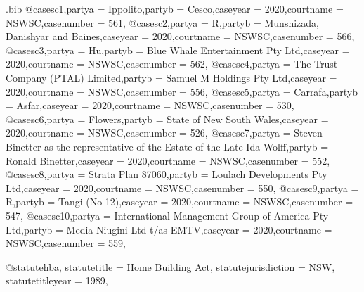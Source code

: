 

\begin{filecontents*}{\jobname.bib}
@case{sc1,partya = {Ippolito},partyb = {Cesco},caseyear = {2020},courtname = {NSWSC},casenumber = {561},}
@case{sc2,partya = {R},partyb = {Munshizada, Danishyar and Baines},caseyear = {2020},courtname = {NSWSC},casenumber = {566},}
@case{sc3,partya = {Hu},partyb = {Blue Whale Entertainment Pty Ltd},caseyear = {2020},courtname = {NSWSC},casenumber = {562},}
@case{sc4,partya = {The Trust Company (PTAL) Limited},partyb = {Samuel M Holdings Pty Ltd},caseyear = {2020},courtname = {NSWSC},casenumber = {556},}
@case{sc5,partya = {Carrafa},partyb = {Asfar},caseyear = {2020},courtname = {NSWSC},casenumber = {530},}
@case{sc6,partya = {Flowers},partyb = {State of New South Wales},caseyear = {2020},courtname = {NSWSC},casenumber = {526},}
@case{sc7,partya = {Steven Binetter as the representative of the Estate of the Late Ida Wolff},partyb = {Ronald Binetter},caseyear = {2020},courtname = {NSWSC},casenumber = {552},}
@case{sc8,partya = {Strata Plan 87060},partyb = {Loulach Developments Pty Ltd},caseyear = {2020},courtname = {NSWSC},casenumber = {550},}
@case{sc9,partya = {R},partyb = {Tangi (No 12)},caseyear = {2020},courtname = {NSWSC},casenumber = {547},}
@case{sc10,partya = {International Management Group of America Pty Ltd},partyb = {Media Niugini Ltd t/as EMTV},caseyear = {2020},courtname = {NSWSC},casenumber = {559},}


@statute{hba,
statutetitle = {Home Building Act},
statutejurisdiction = {NSW},
statutetitleyear = {1989},%
}


\end{filecontents*}



\documentclass[12pt]{article}
\newcommand\rulesep{\rule{0.4\textwidth}{.4pt}}
\usepackage[table]{xcolor}
\pagecolor{blue!3}
\usepackage{fontspec}
\setmainfont{Noto Serif}




\newcommand\abibname{lawcite}
\newcommand\abibstyle{style=\abibname}
\usepackage[
	\abibstyle , 
	indexing=cite,
	citetracker=true,
	ibidtracker=true,
	pagetracker=true,
	idemtracker=true,
	opcittracker=true,
	loccittracker=true,
	autocite=footnote,
   datezeros=true,
	lawcitestyle=default,
	use-toc-parnumrefs=true,
		]{biblatex}

